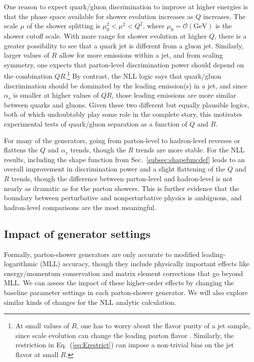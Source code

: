 \documentclass[11pt,letterpaper]{article}
\newcommand{\GeV}{\text{GeV}}
\DeclareRobustCommand{\Sec}[1]{Sec.~\ref{#1}}
\DeclareRobustCommand{\Eq}[1]{Eq.~(\ref{#1})}
\begin{document}
One reason to expect quark/gluon discrimination to improve at higher energies is that the phase space available for shower evolution increases as $Q$ increases.  The scale $\mu$ of the shower splitting is $\mu_0^2 < \mu^2 < Q^2$, where $\mu_0 = \mathcal{O}(\GeV)$ is the shower cutoff scale.  With more range for shower evolution at higher $Q$, there is a greater possibility to see that a quark jet is different from a gluon jet.  Similarly, larger values of $R$ allow for more emissions within a jet, and from scaling symmetry, one expects that parton-level discrimination power should depend on the combination $Q R$.\footnote{At small values of $R$, one has to worry about the flavor purity of a jet sample, since scale evolution can change the leading parton flavor \cite{Dasgupta:2014yra,Dasgupta:2016bnd}.  Similarly, the restriction in \Eq{eq:Erestrict} can impose a non-trivial bias on the jet flavor at small $R$.}  By contrast, the NLL logic says that quark/gluon discrimination should be dominated by the leading emission(s) in a jet, and since $\alpha_s$ is smaller at higher values of $Q R$, those leading emissions are more similar between quarks and gluons.  Given these two different but equally plausible logics, both of which undoubtably play some role in the complete story, this motivates experimental tests of quark/gluon separation as a function of $Q$ and $R$.

For many of the generators, going from parton-level to hadron-level reverses
or flattens the $Q$ and $\alpha_s$ trends, though the $R$ trends are more
stable.  For the NLL results, including the shape function from
\Sec{subsec:shapefuncdef} leads to an overall improvement in discrimination
power and a slight flattening of the $Q$ and $R$ trends, though the
difference between parton-level and hadron-level is not nearly as dramatic as
for the parton showers.  This is further evidence that the boundary between perturbative and nonperturbative physics is ambiguous, and hadron-level comparisons are the most meaningful. 

\subsection{Impact of generator settings}
\label{sec:ee_settings}

Formally, parton-shower generators are only accurate to modified leading-logarithmic (MLL) accuracy, though they include physically important effects like energy/momentum conservation and matrix element corrections that go beyond MLL.  We can assess the impact of these higher-order effects by changing the baseline parameter settings in each parton-shower generator.  We will also explore similar kinds of changes for the NLL analytic calculation.
\end{document}
